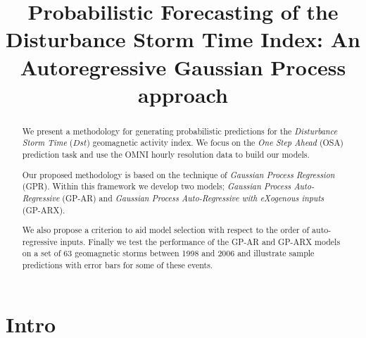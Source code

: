 \documentclass{report}
\title{Probabilistic Forecasting of the Disturbance Storm Time Index: An Autoregressive Gaussian Process approach}
\begin{document}
\begin{abstract}
We present a methodology for generating probabilistic predictions for the \emph{Disturbance Storm Time} ($Dst$) geomagnetic activity index. We focus on the \emph{One Step Ahead} (OSA) prediction task and use the OMNI hourly resolution data to build our models.

Our proposed methodology is based on the technique of \emph{Gaussian Process Regression} (GPR). Within this framework we develop two models; \emph{Gaussian Process Auto-Regressive} (GP-AR) and \emph{Gaussian Process Auto-Regressive with eXogenous inputs} (GP-ARX). 

We also propose a criterion to aid model selection with respect to the order of auto-regressive inputs. Finally we test the performance of the GP-AR and GP-ARX models on a set of 63 geomagnetic storms between 1998 and 2006 and illustrate sample predictions with error bars for some of these events.

\end{abstract}


\section{Intro}
\end{document}

